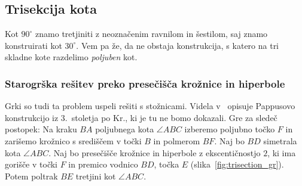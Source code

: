 \subsection{Trisekcija kota}
\label{podpogl:trisekcija}

Kot $90^\circ$ znamo tretjiniti z neoznačenim ravnilom in šestilom, saj znamo konstruirati kot $30^\circ$. Vem pa že, da ne obstaja konstrukcija, s katero na tri skladne kote razdelimo \emph{poljuben} kot.






\subsubsection*{Starogrška rešitev preko presečišča krožnice in hiperbole}

Grki so tudi ta problem uspeli rešiti s stožnicami. Videla v~\cite[str.\ 6--7]{videla1997} opisuje Pappusovo konstrukcijo iz $3$.\ stoletja po Kr., ki je tu ne bomo dokazali. Gre za sledeč postopek: Na kraku $BA$ poljubnega kota $\angle ABC$ izberemo poljubno točko $F$ in zarišemo krožnico s središčem v točki $B$ in polmerom $BF$. Naj bo $BD$ simetrala kota $\angle ABC$. Naj bo presečišče krožnice in hiperbole z ekscentičnostjo $2$, ki ima gorišče v točki $F$ in premico vodnico $BD$, točka $E$ (slika~\ref{fig:trisection_gr}). Potem poltrak $BE$ tretjini kot $\angle ABC$.

